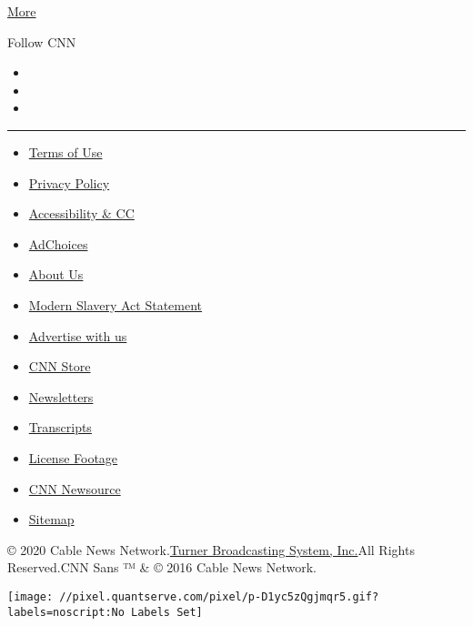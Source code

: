 \href{/more}{More}

Follow CNN

\begin{itemize}
\item
\item
\item
\end{itemize}

\begin{center}\rule{0.5\linewidth}{\linethickness}\end{center}

\begin{itemize}
\tightlist
\item
  \href{/terms}{Terms of Use}
\item
  \href{/privacy}{Privacy Policy}
\item
  \href{/accessibility}{Accessibility \& CC}
\item
  \protect\hyperlink{}{AdChoices}
\item
  \href{/about}{About Us}
\item
  \href{/msa}{Modern Slavery Act Statement}
\item
  \href{https://commercial.cnn.com}{Advertise with us}
\item
  \href{//store.cnn.com}{CNN Store}
\item
  \href{/newsletters}{Newsletters}
\item
  \href{/transcripts}{Transcripts}
\item
  \href{/collection}{License Footage}
\item
  \href{http://cnnnewsource.com}{CNN Newsource}
\item
  \href{https://www.cnn.com/sitemap.html}{Sitemap}
\end{itemize}

© 2020 Cable News Network.\href{//www.turner.com}{Turner Broadcasting
System, Inc.}All Rights Reserved.CNN Sans ™ \& © 2016 Cable News
Network.

\texttt{[image: //pixel.quantserve.com/pixel/p-D1yc5zQgjmqr5.gif?labels=noscript:No Labels Set]}
